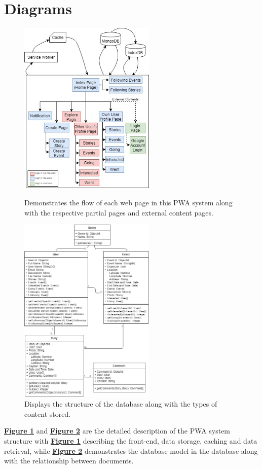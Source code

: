 \documentclass[11pt, a4paper]{article}
\begin{document}
\section{Diagrams}
\begin{figure}[H]
  \begin{center}
    \begin{minipage}[b]{0.4\textwidth}
      \includegraphics[width=6.5cm]{site_map.jpg}
      \caption{Demonstrates the flow of each web page in this PWA system along with the respective
      partial pages and external content pages.}
      \label{figure:site_map}
    \end{minipage}
    \qquad
    \begin{minipage}[b]{0.4\textwidth}
      \includegraphics[width=6.5cm]{uml.jpg}
      \caption{Displays the structure of the database along with the types of content stored.}
      \label{figure:uml}
    \end{minipage}
  \end{center}
\end{figure}
\hyperref[figure:site_map]{\textbf{Figure 1}} and \hyperref[figure:uml]{\textbf{Figure 2}} are the
detailed description of the PWA system structure with \hyperref[figure:site_map]{\textbf{Figure 1}}
describing the front-end, data storage, caching and data retrieval, while
\hyperref[figure:uml]{\textbf{Figure 2}} demonstrates the database model in the database along with
the relationship between documents.
\end{document}
